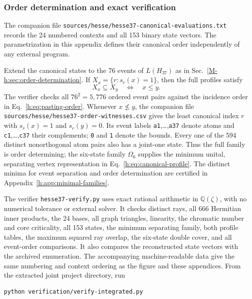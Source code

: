 \documentclass[aps,pra,reprint,superscriptaddress,longbibliography,nofootinbib,floatfix,10pt]{revtex4-2}
\theoremstyle{definition}
\begin{document}
\subsubsection{Order determination and exact verification}\label{h:app:order-determination}

The companion file \texttt{sources/hesse/}\allowbreak\texttt{hesse37-canonical-evaluations.txt} records the 24 numbered contexts and all 153 binary state vectors. The parametrization in this appendix defines their canonical order independently of any external program.

Extend the canonical states to the 76 events of $L(H_{37})$ as in Sec.~\ref{M-h:sec:order-determination}. If $X_x=\{r:s_r(x)=1\}$, then the full profiles satisfy
\begin{equation}
X_x\subseteq X_y\quad\Longleftrightarrow\quad x\le y.
\end{equation}
The verifier checks all $76^2=5{,}776$ ordered event pairs against the incidence order in Eq.~\eqref{h:eq:pasting-order}. Whenever $x\not\le y$, the companion file \texttt{sources/hesse/}\allowbreak\texttt{hesse37-order-witnesses.csv} gives the least canonical index $r$ with $s_r(x)=1$ and $s_r(y)=0$. Its event labels \texttt{a1},\ldots,\texttt{a37} denote atoms and \texttt{c1},\ldots,\texttt{c37} their complements; \texttt{0} and \texttt{1} denote the bounds. Every one of the 594 distinct nonorthogonal atom pairs also has a joint-one state. Thus the full family is order determining; the six-state family $\Omega_6$ supplies the minimum unital, separating vertex representation in Eq.~\eqref{h:eq:canonical-profile}. The distinct minima for event separation and order determination are certified in Appendix~\ref{h:app:minimal-families}.

The verifier \texttt{hesse37-verify.py} uses exact rational arithmetic in $\mathbb Q(\zeta)$, with no numerical tolerance or external solver. It checks distinct rays, all 666 Hermitian inner products, the 24 bases, all graph triangles, linearity, the chromatic number and core criticality, all 153 states, the minimum separating family, both profile tables, the maximum squared ray overlap, the six-state double cover, and all event-order comparisons. It also compares the reconstructed state vectors with the archived enumeration. The accompanying machine-readable data give the same numbering and context ordering as the figure and these appendices. From the extracted joint project directory, run
\begin{verbatim}
python verification/verify-integrated.py
\end{verbatim}
\end{document}

